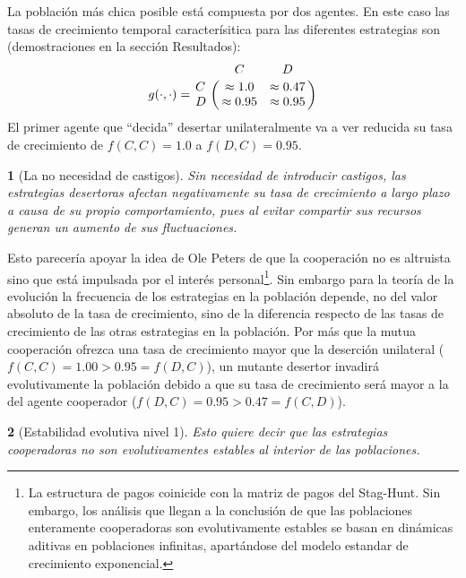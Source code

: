 \documentclass[a4paper,10pt]{article}
\newif\ifen
\newif\ifes
\newcommand{\en}[1]{\ifen#1\fi}
\newcommand{\es}[1]{\ifes#1\fi}
\newtheorem{conclution}{\en{Conclution}\es{Conclusión}}%
\begin{document}
La población más chica posible está compuesta por dos agentes.
%
En este caso las tasas de crecimiento temporal caracterísitica para las diferentes estrategias son (demostraciones en la sección Resultados):
%
\begin{equation}
   g(\cdot,\cdot) = \bordermatrix{ & C & D \cr
      C & \approx 1.0 & \approx 0.47 \cr
      D & \approx 0.95 & \approx 0.95 } 
\end{equation}
%
El primer agente que ``decida'' desertar unilateralmente va a ver reducida su tasa de crecimiento de $f(C,C) = 1.0$ a $ f(D,C) = 0.95$.
% 
\begin{conclution}[La no necesidad de castigos]
Sin necesidad de introducir castigos, las estrategias desertoras afectan negativamente su tasa de crecimiento a largo plazo a causa de su propio comportamiento, pues al evitar compartir sus recursos generan un aumento de sus fluctuaciones.
\end{conclution}

Esto parecería apoyar la idea de Ole Peters de que la cooperación no es altruista sino que está impulsada por el interés personal\footnote{
La estructura de pagos coinicide con la matriz de pagos del Stag-Hunt. Sin embargo, los análisis que llegan a la conclusión de que las poblaciones enteramente cooperadoras son evolutivamente estables se basan en dinámicas aditivas en poblaciones infinitas, apartándose del modelo estandar de crecimiento exponencial.}.
Sin embargo para la teoría de la evolución la frecuencia de los estrategias en la población depende, no del valor absoluto de la tasa de crecimiento, sino de la diferencia respecto de las tasas de crecimiento de las otras estrategias en la población.
Por más que la mutua cooperación ofrezca una tasa de crecimiento mayor que la deserción unilateral ($f(C,C) = 1.00 > 0.95 = f(D,C)$), un mutante desertor invadirá evolutivamente la población debido a que su tasa de crecimiento será mayor a la del agente cooperador ($f(D,C) = 0.95 > 0.47 = f(C,D)$). 

\begin{conclution}[Estabilidad evolutiva nivel 1]
Esto quiere decir que las estrategias cooperadoras no son evolutivamentes estables al interior de las poblaciones.
\end{conclution}
\end{document}

